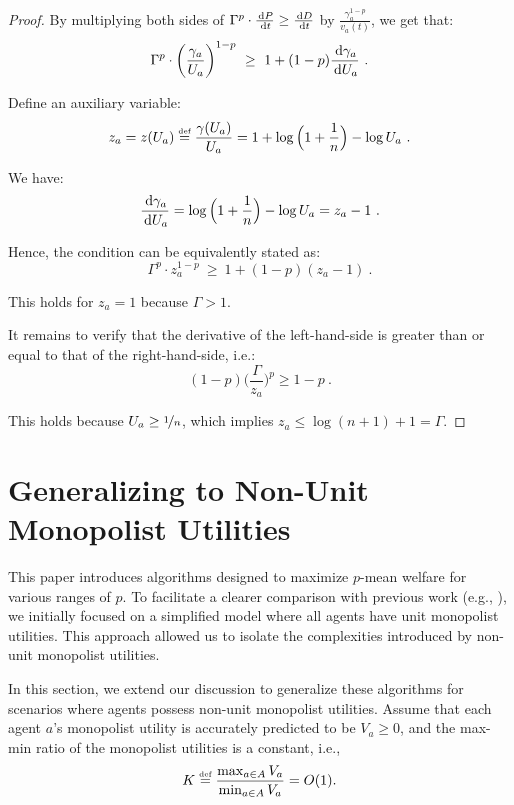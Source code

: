 \documentclass[11pt,letterpaper]{article}
\newcommand{\dif}[1]{\,\text{\rm d} #1}
\newcommand{\utility}{U}
\newcommand{\defeq}{\stackrel{\textrm{\tiny def}}{=}}
\begin{document}
\begin{proof}
	By multiplying both sides of $\Gamma^p \cdot \frac{\dif{P}}{\dif{t}} \geq \frac{\dif{D}}{\dif{t}}$ by $\frac{\gamma_a^{1-p}}{v_a(t)}$, we get that:
	\begin{equation*}
		\Gamma^p \cdot \left(\frac{\gamma_a}{\utility_a}\right)^{1-p}
		~\geq~
		1 + (1-p) \frac{\dif{\gamma_a}}{\dif{\utility_a}}~.
	\end{equation*}
	
	Define an auxiliary variable:
	\[
		z_a = z (\utility_a) \defeq \dfrac{\gamma (\utility_a)}{\utility_a} = 1 + \log\Big(1+\frac{1}{n}\Big)-\log \utility_a
		~.
	\]
	
	We have:
	\[
		\frac{\dif{\gamma_a}}{\dif{\utility_a}}
    	= \log\Big(1+\frac{1}{n}\Big)-\log \utility_a
    	= z_a - 1
    	~.
	\]
	
	Hence, the condition can be equivalently stated as:
	\begin{equation}
		\label{eq:p>0-ratio-desired-ineq-transformed-log(n)}
		\Gamma ^p \cdot z_a^{1-p}
		~\geq~ 1 + (1-p) (z_a - 1)~.
	\end{equation}
	
	This holds for $z_a = 1$ because $\Gamma > 1$. 

	It remains to verify that the derivative of the left-hand-side is greater than or equal to that of the right-hand-side, i.e.:
	\begin{equation*}
		(1-p) \bigg(\frac{\Gamma}{z_a}\bigg)^p \ge 1-p
		~.
	\end{equation*}
	
	This holds because $U_a \ge \nicefrac{1}{n}$, which implies $z_a \le \log (n+1)+1 = \Gamma$.
\end{proof}




    

 \section{Generalizing to Non-Unit Monopolist Utilities}
\label{sec:discussion}


This paper introduces algorithms designed to maximize $p$-mean welfare for various ranges of $p$. To facilitate a clearer comparison with previous work (e.g., \citet{BarmanKM:AAAI:2022}), we initially focused on a simplified model where all agents have unit monopolist utilities. This approach allowed us to isolate the complexities introduced by non-unit monopolist utilities. 

In this section, we extend our discussion to generalize these algorithms for scenarios where agents possess non-unit monopolist utilities. Assume that each agent $a$'s monopolist utility is accurately predicted to be $V_a\geq 0$, and the max-min ratio of the monopolist utilities is a constant, i.e.,
\[K \defeq \frac{\max_{a\in A} V_a}{\min_{a\in A} V_a}=O(1).\]
\end{document}

